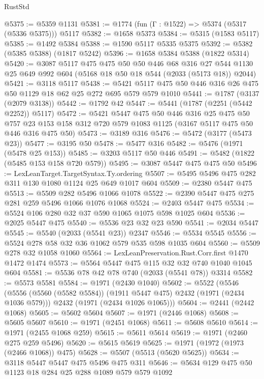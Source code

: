 \begin{lexlean}{RustStd}
\begin{coremodule}
{\begin{coremodule}
{{{{{{{{{{{{{@5375 := @5359 @1131
@5381 := @1774 (fun (Γ : @1522) => @5374 (@5317 (@5336 @5375))) @5117
@5382 := @1658 @5373
@5384 := @5315 (@1583 @5117)
@5385 := @1492 @5384
@5388 := @1590 @5117 @5335 @5375
@5392 := @5382 (@5385 @5388) (@1817 @5242)
@5396 := @1658 @5384 @5388 (@1822 @5314)
@5420 := @3087
    @5117
    @475
    @475
    @50
    @50
    @446
    @68
    @316
    @27
    @544
    @1130
    @25
    @649
    @992
    @604
    (@5168 @18 @50 @18 @544 (@2033 (@5173 @18)) @2044)
@5421 := @3118 @5117
@5438 := @5421 @5117 @475 @50 @446 @316 @26 @475 @50 @1129 @18 @62 @25 @272 @695 @579 @579 @1010
@5441 := @1787 (@3137 (@2079 @3138))
@5442 := @1792 @42
@5447 := @5441 (@1787 (@2251 (@5442 @2252)) @5117)
@5472 := @5421
    @5447
    @475
    @50
    @446
    @316
    @25
    @475
    @50
    @757
    @23
    @153
    @158
    @312
    @720
    @579
    @1083
    @1125
    (@3167 @5117 @475 @50 @446 @316 @475 @50)
@5473 := @3189 @316
@5476 := @5472 (@3177 (@5473 @23))
@5477 := @3195 @50
@5478 := @5477 @316
@5482 := @5476 (@1971 (@5478 @25 @153))
@5485 := @3203 @5117 @50 @446
@5491 := @5482 (@1822 (@5485 @153 @158 @720 @579))
@5495 := @3087 @5447 @475 @475 @50
@5496 := LexLeanTarget.TargetSyntax.Ty.ordering
@5507 := @5495 @5496 @475 @282 @311 @130 @1080 @1124 @25 @649 @1017 @604
@5509 := @2380 @5447 @475
@5513 := @5509 @282 @5496 @1066 @1078
@5522 := @2390 @5447 @475 @275 @281 @259 @5496 @1066 @1076 @1068
@5524 := @2403 @5447 @475
@5534 := @5524 @106 @280 @32 @37 @590 @1065 @1075 @598 @1025 @604
@5536 := @2025 @5447 @475
@5540 := @5536 @23 @32 @23 @590
@5541 := @2034 @5447
@5545 := @5540 (@2033 (@5541 @23)) @2347
@5546 := @5534 @5545
@5556 := @5524 @278 @58 @32 @36 @1062 @579 @535 @598 @1035 @604
@5560 := @5509 @278 @32 @1058 @1060
@5564 := LexLeanPreservation.Rust.Corr.first @1470 @1472 @1474
@5573 := @5564 @5447 @475 @115 @32 @32 @740 @1040 @1045 @604
@5581 := @5536 @78 @42 @78 @740 (@2033 (@5541 @78)) @3314
@5582 := @5573 @5581
@5584 := @1971 (@2430 @1040)
@5602 := @5522
    (@5546
      (@5556 (@5560 (@5582 @5584)) (@1911 @5447 @475) @2432 (@1971 (@2434 @1036 @579)))
      @2432
      (@1971 (@2434 @1026 @1065)))
@5604 := @2441 (@2442 @1068)
@5605 := @5602 @5604
@5607 := @1971 (@2446 @1068)
@5608 := @5605 @5607
@5610 := @1971 (@2451 @1068)
@5611 := @5608 @5610
@5614 := @1971 (@2455 @1068 @259)
@5615 := @5611 @5614
@5619 := @1971 (@2460 @275 @259 @5496)
@5620 := @5615 @5619
@5625 := @1971 (@1972 (@1973 (@2466 @1068)) @475)
@5628 := @5507 (@5513 (@5620 @5625))
@5634 := @3118 @5447 @5447 @475 @5496 @475 @311
@5646 := @5634 @129 @475 @50 @1123 @18 @284 @25 @288 @1089 @579 @579 @1092
}}}}}}}}}}}}}
\end{coremodule}}
\end{coremodule}
\end{lexlean}
